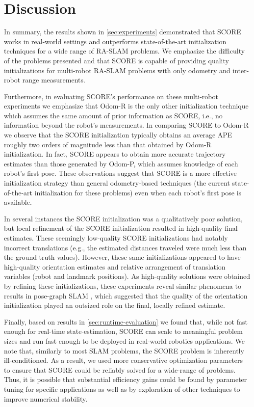 \section{Discussion}

In summary, the results shown in
\cref{sec:experiments} demonstrated
that SCORE works in real-world settings and outperforms state-of-the-art
initialization techniques for a wide range of RA-SLAM problems. We emphasize
the difficulty of the problems presented and that SCORE is capable
of providing quality initializations for multi-robot RA-SLAM problems with only
odometry and inter-robot range measurements.

Furthermore, in evaluating SCORE's performance on these multi-robot experiments
we emphasize that Odom-R is the only other initialization technique which
assumes the same amount of prior information as SCORE, i.e., no information
beyond the robot's measurements. In comparing SCORE to Odom-R we observe that
the SCORE initialization typically obtains an average APE roughly two orders of
magnitude less than that obtained by Odom-R initialization. In fact, SCORE
appears to obtain more accurate trajectory estimates than those generated by
Odom-P, which assumes knowledge of each robot's first pose. These
observations suggest that SCORE is a more effective initialization strategy than
general odometry-based techniques (the current state-of-the-art initialization
for these problems) even when each robot's first pose is
available.

In several instances the SCORE initialization was a qualitatively poor solution,
but local refinement of the SCORE initialization resulted in high-quality final
estimates. These seemingly low-quality SCORE initializations had notably
incorrect translations (e.g., the estimated distances traveled were much less
than the ground truth values). However, these same initializations appeared to
have high-quality orientation estimates and relative arrangement of translation
variables (robot and landmark positions). As high-quality solutions were
obtained by refining these initializations, these experiments reveal similar
phenomena to results in pose-graph SLAM \cite{carlone15aicra}, which suggested
that the quality of the orientation initialization played an outsized role on
the final, locally refined estimate.

Finally, based on results in \cref{sec:runtime-evaluation} we found that, while
not fast enough for real-time state-estimation, SCORE can scale to meaningful
problem sizes and run fast enough to be deployed in real-world robotics
applications. We note that, similarly to most SLAM problems, the SCORE problem
is inherently ill-conditioned. As a result, we used more conservative
optimization parameters to ensure that SCORE could be reliably solved for a
wide-range of problems. Thus, it is possible that substantial efficiency gains
could be found by parameter tuning for specific applications as well as by
exploration of other techniques to improve numerical stability.


